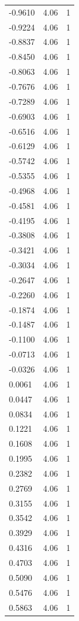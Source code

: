 \begin{longtable}{lrr}
  -0.9610 & 4.06 & 1 \\
  -0.9224 & 4.06 & 1 \\
  -0.8837 & 4.06 & 1 \\
  -0.8450 & 4.06 & 1 \\
  -0.8063 & 4.06 & 1 \\
  -0.7676 & 4.06 & 1 \\
  -0.7289 & 4.06 & 1 \\
  -0.6903 & 4.06 & 1 \\
  -0.6516 & 4.06 & 1 \\
  -0.6129 & 4.06 & 1 \\
  -0.5742 & 4.06 & 1 \\
  -0.5355 & 4.06 & 1 \\
  -0.4968 & 4.06 & 1 \\
  -0.4581 & 4.06 & 1 \\
  -0.4195 & 4.06 & 1 \\
  -0.3808 & 4.06 & 1 \\
  -0.3421 & 4.06 & 1 \\
  -0.3034 & 4.06 & 1 \\
  -0.2647 & 4.06 & 1 \\
  -0.2260 & 4.06 & 1 \\
  -0.1874 & 4.06 & 1 \\
  -0.1487 & 4.06 & 1 \\
  -0.1100 & 4.06 & 1 \\
  -0.0713 & 4.06 & 1 \\
  -0.0326 & 4.06 & 1 \\
  0.0061 & 4.06 & 1 \\
  0.0447 & 4.06 & 1 \\
  0.0834 & 4.06 & 1 \\
  0.1221 & 4.06 & 1 \\
  0.1608 & 4.06 & 1 \\
  0.1995 & 4.06 & 1 \\
  0.2382 & 4.06 & 1 \\
  0.2769 & 4.06 & 1 \\
  0.3155 & 4.06 & 1 \\
  0.3542 & 4.06 & 1 \\
  0.3929 & 4.06 & 1 \\
  0.4316 & 4.06 & 1 \\
  0.4703 & 4.06 & 1 \\
  0.5090 & 4.06 & 1 \\
  0.5476 & 4.06 & 1 \\
  0.5863 & 4.06 & 1 \\

\end{longtable}
